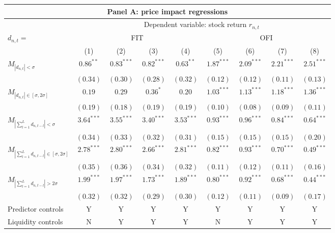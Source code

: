 \begin{tabular}{lcccccccc}
  \hline \multicolumn{9}{c}{Panel A: price impact regressions} \\
 \hline
    & \multicolumn{8}{c}{Dependent variable: stock return $r_{n,t}$} \\

    \cmidrule(l){2-9} $d_{n,t} = $ & \multicolumn{4}{c}{FIT} & \multicolumn{4}{c}{OFI} \\
 \cmidrule(l){2-5} \cmidrule(l){6-9}
  & (1) & (2) & (3) & (4) & (5) & (6) & (7) & (8) \\ 
   \vspace{5pt}$M_{\left|d_{n,t}\right| < \sigma}$ & $0.86^{**}$ & $0.83^{***}$ & $0.82^{***}$ & $0.63^{**}$ & $1.87^{***}$ & $2.09^{***}$ & $2.21^{***}$ & $2.51^{***}$ \\ 
   & $(0.34)$ & $(0.30)$ & $(0.28)$ & $(0.32)$ & $(0.12)$ & $(0.12)$ & $(0.11)$ & $(0.13)$ \\ 
  $M_{\left|d_{n,t}\right| \in [\sigma, 2\sigma]}$ & $0.19$ & $0.29$ & $0.36^{*}$ & $0.20$ & $1.03^{***}$ & $1.13^{***}$ & $1.18^{***}$ & $1.36^{***}$ \\ 
   & $(0.19)$ & $(0.18)$ & $(0.19)$ & $(0.19)$ & $(0.10)$ & $(0.08)$ & $(0.09)$ & $(0.11)$ \\ 
  $M_{\left|\sum_{l=1}^L d_{n,t-l}\right| < \sigma}$ & $3.64^{***}$ & $3.55^{***}$ & $3.40^{***}$ & $3.53^{***}$ & $0.93^{***}$ & $0.96^{***}$ & $0.84^{***}$ & $0.64^{***}$ \\ 
   & $(0.34)$ & $(0.33)$ & $(0.32)$ & $(0.31)$ & $(0.15)$ & $(0.15)$ & $(0.15)$ & $(0.20)$ \\ 
  $M_{\left|\sum_{l=1}^L d_{n,t-l}\right| \in [\sigma, 2\sigma]}$ & $2.78^{***}$ & $2.80^{***}$ & $2.66^{***}$ & $2.81^{***}$ & $0.82^{***}$ & $0.93^{***}$ & $0.70^{***}$ & $0.49^{***}$ \\ 
   & $(0.35)$ & $(0.36)$ & $(0.34)$ & $(0.32)$ & $(0.11)$ & $(0.12)$ & $(0.11)$ & $(0.16)$ \\ 
  $M_{\left|\sum_{l=1}^L d_{n,t-l}\right| > 2 \sigma}$ & $1.99^{***}$ & $1.97^{***}$ & $1.73^{***}$ & $1.89^{***}$ & $0.80^{***}$ & $0.92^{***}$ & $0.68^{***}$ & $0.44^{***}$ \\ 
   \vspace{5pt} & $(0.32)$ & $(0.32)$ & $(0.29)$ & $(0.30)$ & $(0.12)$ & $(0.11)$ & $(0.09)$ & $(0.17)$ \\ 
  Predictor controls & Y & Y & Y & Y & Y & Y & Y & Y \\ 
  Liquidity controls & N & Y & Y & Y & N & Y & Y & Y \\ 

\end{tabular}

